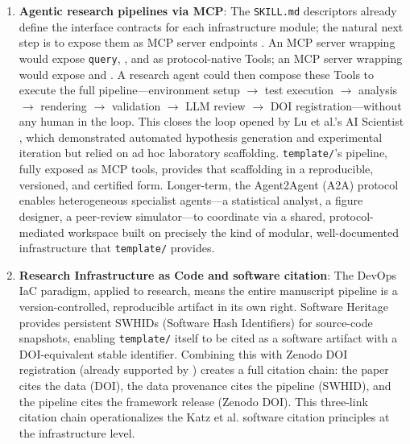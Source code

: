 \documentclass[
  english,
]{article}
\begin{document}
\begin{enumerate}
  algorithmic logic and that \texttt{src/} modules do not import from
  \texttt{scripts/}.
\item
  \textbf{Agentic research pipelines via MCP}: The \texttt{SKILL.md}
  descriptors already define the interface contracts for each
  infrastructure module; the natural next step is to expose them as MCP
  server endpoints \citep{anthropic2024mcp}. An MCP server wrapping
   would expose \texttt{query},
  , and  as
  protocol-native Tools; an MCP server wrapping
   would expose
   and .
  A research agent could then compose these Tools to execute the full
  pipeline---environment setup \texorpdfstring{\ensuremath{\to}}{->} test execution \texorpdfstring{\ensuremath{\to}}{->} analysis \texorpdfstring{\ensuremath{\to}}{->} rendering \texorpdfstring{\ensuremath{\to}}{->}
  validation \texorpdfstring{\ensuremath{\to}}{->} LLM review \texorpdfstring{\ensuremath{\to}}{->} DOI registration---without any human in the
  loop. This closes the loop opened by Lu et al.'s AI Scientist
  \citep{lu2024aiscientist}, which demonstrated automated hypothesis
  generation and experimental iteration but relied on ad hoc laboratory
  scaffolding. \texttt{template/}'s pipeline, fully exposed as MCP
  tools, provides that scaffolding in a reproducible, versioned, and
  certified form. Longer-term, the Agent2Agent (A2A) protocol
  \citep{google2025a2a} enables heterogeneous specialist agents---a
  statistical analyst, a figure designer, a peer-review simulator---to
  coordinate via a shared, protocol-mediated workspace built on
  precisely the kind of modular, well-documented infrastructure that
  \texttt{template/} provides.
\item
  \textbf{Research Infrastructure as Code and software citation}: The
  DevOps IaC paradigm, applied to research, means the entire manuscript
  pipeline is a version-controlled, reproducible artifact in its own
  right. Software Heritage \citep{cosmo2020softwareheritage} provides
  persistent SWHIDs (Software Hash Identifiers) for source-code
  snapshots, enabling \texttt{template/} itself to be cited as a
  software artifact with a DOI-equivalent stable identifier. Combining
  this with Zenodo DOI registration (already supported by
  ) creates a full citation chain: the
  paper cites the data (DOI), the data provenance cites the pipeline
  (SWHID), and the pipeline cites the framework release (Zenodo DOI).
  This three-link citation chain operationalizes the Katz et al.
  \citep{katz2021software} software citation principles at the
  infrastructure level.
\end{enumerate}
\end{document}
